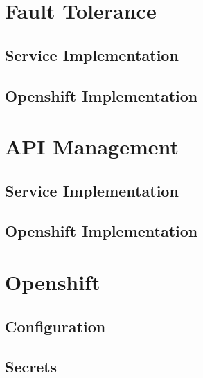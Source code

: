 \section{Fault Tolerance}
\label{sec:esbi-fault}

\subsection{Service Implementation}
\label{sec:esbi-fault-service}

\subsection{Openshift Implementation}
\label{sec:esbi-fault-openshift}

\section{API Management}
\label{sec:esbi-api}

\subsection{Service Implementation}
\label{sec:esbi-api-service}

\subsection{Openshift Implementation}
\label{sec:esbi-api-openshift}

\section{Openshift}
\label{sec:esbi-openshift}

\subsection{Configuration}
\label{sec:esbi-openshift-config}

\subsection{Secrets}
\label{sec:esbi-openshift-secrets}

